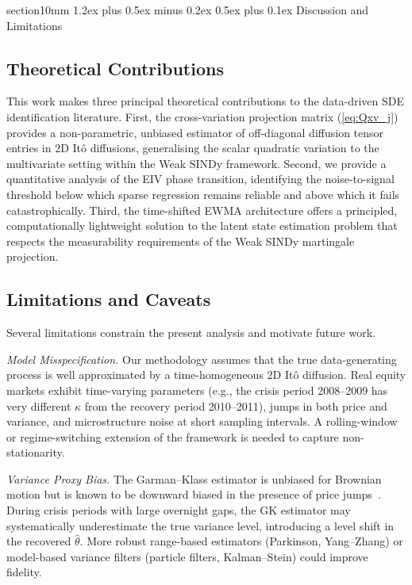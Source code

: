 \documentclass[reprint, amsmath, amssymb, aps, prl, superscriptaddress, nofootinbib]{revtex4-2}
\makeatletter
\def\section{\@startsection
  {section}{1}{0mm}
  {1.2ex plus 0.5ex minus 0.2ex}
  {0.5ex plus 0.1ex}
  {\centering\normalfont\small\bfseries}}
\makeatother
\begin{document}
\section{Discussion and Limitations}

\subsection{Theoretical Contributions}

This work makes three principal theoretical contributions to the data-driven
SDE identification literature. First, the cross-variation projection matrix
(\ref{eq:Qxv_j}) provides a non-parametric, unbiased estimator of off-diagonal
diffusion tensor entries in 2D It\^{o} diffusions, generalising the scalar
quadratic variation to the multivariate setting within the Weak SINDy framework.
Second, we provide a quantitative analysis of the EIV phase transition, identifying
the noise-to-signal threshold below which sparse regression remains reliable and
above which it fails catastrophically. Third, the time-shifted EWMA architecture
offers a principled, computationally lightweight solution to the latent state
estimation problem that respects the measurability requirements of the Weak SINDy
martingale projection.



\subsection{Limitations and Caveats}

Several limitations constrain the present analysis and motivate future work.

\textit{Model Misspecification.}
Our methodology assumes that the true data-generating process is well approximated
by a time-homogeneous 2D It\^{o} diffusion. Real equity markets exhibit
time-varying parameters (e.g., the crisis period 2008--2009 has very different
$\kappa$ from the recovery period 2010--2011), jumps in both price and variance,
and microstructure noise at short sampling intervals. A rolling-window or
regime-switching extension of the framework is needed to capture non-stationarity.

\textit{Variance Proxy Bias.}
The Garman--Klass estimator is unbiased for Brownian motion but is known to be
downward biased in the presence of price jumps~\cite{GarmanKlass1980}. During
crisis periods with large overnight gaps, the GK estimator may systematically
underestimate the true variance level, introducing a level shift in the recovered
$\hat\theta$. More robust range-based estimators (Parkinson, Yang--Zhang) or
model-based variance filters (particle filters, Kalman--Stein) could improve
fidelity.
\end{document}
